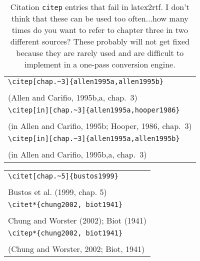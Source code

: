 \documentclass{article}
\begin{document}
\begin{table}
\begin{center}
\begin{tabular}{l}
    \verb#\citep[chap.~3]{allen1995a,allen1995b}# \\
    \citep[chap.~3]{allen1995a,allen1995b} \\
    (Allen and Carifio, 1995b,a, chap.~3) \\
\hline
    \verb#\citep[in][chap.~3]{allen1995a,hooper1986}# \\
    \citep[in][chap.~3]{allen1995a,hooper1986} \\
    (in Allen and Carifio, 1995b; Hooper, 1986, chap.~3)\\
\hline
    \verb#\citep[in][chap.~3]{allen1995a,allen1995b}# \\
    \citep[in][chap.~3]{allen1995a,allen1995b} \\
    (in Allen and Carifio, 1995b,a, chap.~3)\\
\end{tabular}
\end{center}
\caption{Citation \texttt{citep} entries that fail in latex2rtf.  I don't think
that these can be used too often...how many times do you want to refer to chapter
three in two different sources?  These probably will not get fixed because they
are rarely used and are difficult to implement in a one-pass conversion engine.}
\end{table}

\begin{center}
\begin{tabular}{l}
\verb#\citet[chap.~5]{bustos1999}#\\
\citet[chap.~5]{bustos1999}\\
Bustos et al. (1999, chap. 5)\\
\hline
\verb#\citet*{chung2002, biot1941}#\\
\citet*{chung2002, biot1941}\\
Chung and Worster (2002); Biot (1941)\\
\hline
\verb#\citep*{chung2002, biot1941}#\\
\citep*{chung2002, biot1941}\\
(Chung and Worster, 2002; Biot, 1941)\\
\end{tabular}
\end{center}
\end{document}
